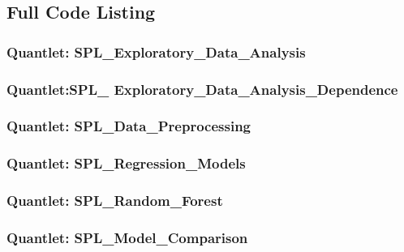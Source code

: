 







\FloatBarrier

\subsection{Full Code Listing}
\subsubsection{Quantlet: SPL\_Exploratory\_Data\_Analysis}

\subsubsection{Quantlet:SPL\_ Exploratory\_Data\_Analysis\_Dependence}

\subsubsection{Quantlet: SPL\_Data\_Preprocessing}

\subsubsection{Quantlet: SPL\_Regression\_Models}

\subsubsection{Quantlet: SPL\_Random\_Forest}

\subsubsection{Quantlet: SPL\_Model\_Comparison}

